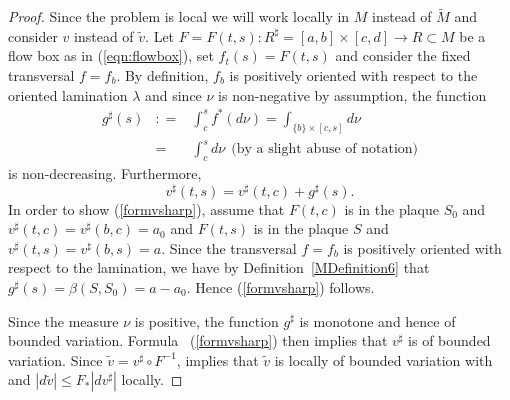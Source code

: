 \documentclass{ip-journal}
\theoremstyle{definition}
\numberwithin{equation}{section}
\begin{document}
  
\begin{proof} 
  Since the problem is local we will work locally in $M$ instead of $\tilde M$ and consider $v$ instead of $\tilde v$. Let
   $F=F(t,s): R^\sharp=[a,b] \times [c,d]  \rightarrow  R \subset M$ be
 a flow box as in (\ref{eqn:flowbox}), set $f_t(s) = F(t,s)$ and consider the fixed transversal $f = f_b$. By definition,  $f_b$ is  positively oriented with respect to the oriented lamination $\lambda$ and since $\nu$ is non-negative by assumption, the function 
\begin{eqnarray}\label{gsharp}
g^\sharp(s) &: =&\int_c^sf^*( d\nu)
 =\int_{\{b\} \times [c,s]} d\nu \nonumber \\
& =& \int_c^s d\nu \ \ \mbox{(by a slight abuse of notation)} 
\end{eqnarray}
is non-decreasing. Furthermore,
\begin{equation}\label{formvsharp}
v^\sharp(t,s)=v^\sharp(t,c)+g^\sharp(s).
\end{equation}
In order to show (\ref{formvsharp}), assume that $F(t,c)$ is in the plaque $S_0$ and  $v^\sharp(t,c)=v^\sharp(b,c)=a_0$ and $F(t,s)$ is in the plaque $S$ and  $v^\sharp(t,s)=v^\sharp(b,s)=a$. Since the transversal $f=f_b$ is positively oriented with respect to the lamination, we have by Definition~\ref{MDefinition6} that $g^\sharp(s)=\beta(S,S_0)=a-a_0$. Hence  (\ref{formvsharp}) follows.

Since the measure $\nu$ is positive, the function $g^\sharp$ is monotone and hence of bounded variation. Formula ~(\ref{formvsharp}) then implies that $v^\sharp$ is of bounded variation. Since $\tilde v=v^\sharp \circ F^{-1}$, \cite[Theorem 3.16]{ambrosio} implies that $\tilde v$ is locally of bounded variation with and  $|d \tilde v| \leq F_*|dv^\sharp|$ locally.
\end{proof}
%
%
%
%
%
%
%
%
\end{document}
